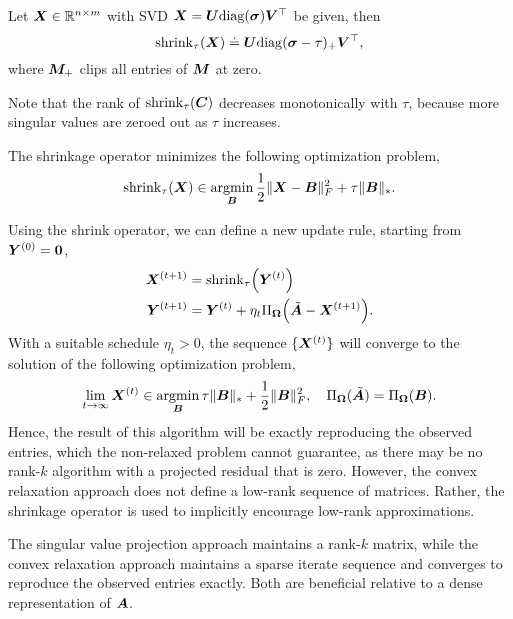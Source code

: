 \begin{definition}
    Let $\bm{X} \in \mathbb{R}^{n\times m}$ with SVD $\bm{X} = \bm{U} \mathrm{diag}(\bm{\sigma})
        \bm{V}^\top$ be given, then \[
        \mathrm{shrink}_{\tau}(\bm{X}) \doteq \bm{U}\mathrm{diag}(\bm{\sigma} - \tau)_+ \bm{V}^\top,
    \]
    where $\bm{M}_+$ clips all entries of $\bm{M}$ at zero.
\end{definition}
Note that the rank of $\mathrm{shrink}_{\tau}(\bm{C})$ decreases monotonically with $\tau$, because
more singular values are zeroed out as $\tau$ increases.

\begin{theorem}
    The shrinkage operator minimizes the following optimization problem, \[
        \mathrm{shrink}_{\tau}(\bm{X}) \in \operatorname*{argmin}_{\bm{B}} \frac{1}{2} \| \bm{X} - \bm{B} \|_F^2 + \tau \| \bm{B} \|_*.
    \]
\end{theorem}

Using the shrink operator, we can define a new update rule, starting from $\bm{Y}^{(0)} =
    \bm{0}$,
\begin{align*}
    \mat{X}^{(t+1)} & = \mathrm{shrink}_{\tau}\lft( \mat{Y}^{(t)} \rgt)                                         \\
    \mat{Y}^{(t+1)} & = \mat{Y}^{(t)} + \eta_t \Pi_{\mat{\Omega}}\lft( \tilde{\mat{A}} - \mat{X}^{(t+1)} \rgt).
\end{align*}
With a suitable schedule $\eta_t > 0$, the sequence $\{ \bm{X}^{(t)} \}$ will converge to the solution of the following optimization problem, \[
    \lim_{t\to \infty} \bm{X}^{(t)} \in \operatorname*{argmin}_{\bm{B}} \tau \| \bm{B} \|_* + \frac{1}{2} \| \bm{B} \|_F^2, \quad \Pi_{\bm{\Omega}}(\tilde{\bm{A}}) = \Pi_{\bm{\Omega}}(\bm{B}).
\]
Hence, the result of this algorithm will be exactly reproducing the observed entries, which the
non-relaxed problem cannot guarantee, as there may be no rank-$k$ algorithm with a projected
residual that is zero. However, the convex relaxation approach does not define a low-rank sequence
of matrices. Rather, the shrinkage operator is used to implicitly encourage low-rank
approximations.

\begin{important}
    The singular value projection approach maintains a rank-$k$ matrix, while the convex
    relaxation approach maintains a sparse iterate sequence and converges to reproduce the observed
    entries exactly. Both are beneficial relative to a dense representation of $\bm{A}$.
\end{important}

